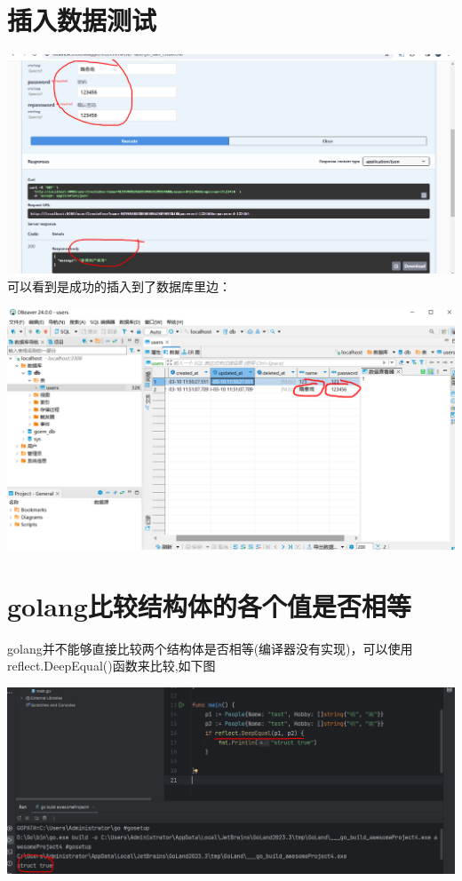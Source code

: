 \documentclass[12pt]{article}
\begin{document}
	\section{插入数据测试}
	\includegraphics{9.png}
	可以看到是成功的插入到了数据库里边：
	
	\includegraphics[scale=0.7]{10.png}
	\section{golang比较结构体的各个值是否相等}
	golang并不能够直接比较两个结构体是否相等(编译器没有实现)，可以使用reflect.DeepEqual()函数来比较,如下图
	
	\includegraphics[scale=0.4]{11.png}
		
\end{document}
